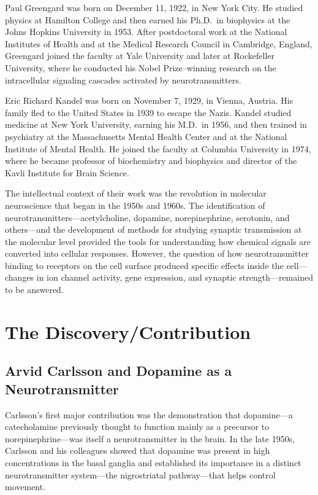 Paul Greengard was born on December 11, 1922, in New York City. He studied physics at Hamilton College and then earned his Ph.D.\ in biophysics at the Johns Hopkins University in 1953. After postdoctoral work at the National Institutes of Health and at the Medical Research Council in Cambridge, England, Greengard joined the faculty at Yale University and later at Rockefeller University, where he conducted his Nobel Prize--winning research on the intracellular signaling cascades activated by neurotransmitters.

Eric Richard Kandel was born on November 7, 1929, in Vienna, Austria. His family fled to the United States in 1939 to escape the Nazis. Kandel studied medicine at New York University, earning his M.D.\ in 1956, and then trained in psychiatry at the Massachusetts Mental Health Center and at the National Institute of Mental Health. He joined the faculty at Columbia University in 1974, where he became professor of biochemistry and biophysics and director of the Kavli Institute for Brain Science.

The intellectual context of their work was the revolution in molecular neuroscience that began in the 1950s and 1960s. The identification of neurotransmitters---acetylcholine, dopamine, norepinephrine, serotonin, and others---and the development of methods for studying synaptic transmission at the molecular level provided the tools for understanding how chemical signals are converted into cellular responses. However, the question of how neurotransmitter binding to receptors on the cell surface produced specific effects inside the cell---changes in ion channel activity, gene expression, and synaptic strength---remained to be answered.

\section{The Discovery/Contribution}

\subsection{Arvid Carlsson and Dopamine as a Neurotransmitter}

Carlsson's first major contribution was the demonstration that dopamine---a catecholamine previously thought to function mainly as a precursor to norepinephrine---was itself a neurotransmitter in the brain. In the late 1950s, Carlsson and his colleagues showed that dopamine was present in high concentrations in the basal ganglia and established its importance in a distinct neurotransmitter system---the nigrostriatal pathway---that helps control movement.

